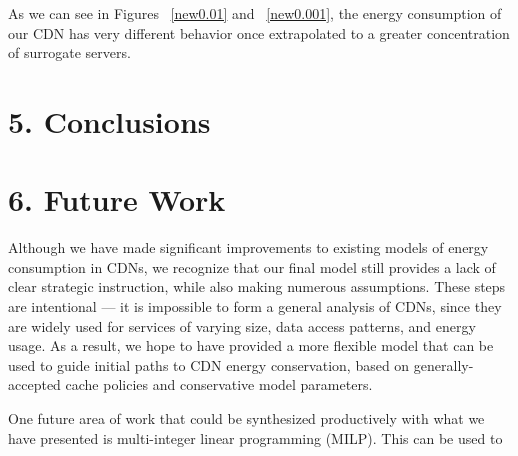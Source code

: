 \documentclass[
	a4paper, %
	10pt, %
	unnumberedsections, %
	twoside, %
]{LTJournalArticle}
\begin{document}
As we can see in Figures ~\ref{new0.01} and ~\ref{new0.001}, the energy consumption of our CDN has very different behavior once extrapolated to a greater concentration of surrogate servers.

\section{5. Conclusions}



\section{6. Future Work}
Although we have made significant improvements to existing models of energy consumption in CDNs, we recognize that our final model still provides a lack of clear strategic instruction, while also making numerous assumptions. These steps are intentional --- it is impossible to form a general analysis of CDNs, since they are widely used for services of varying size, data access patterns, and energy usage. As a result, we hope to have provided a more flexible model that can be used to guide initial paths to CDN energy conservation, based on generally-accepted cache policies and conservative model parameters. 

One future area of work that could be synthesized productively with what we have presented is multi-integer linear programming (MILP). This can be used to 






\printbibliography
\end{document}
